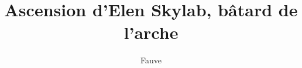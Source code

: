 %
%
%
%



\title{Ascension d’Elen Skylab, bâtard de l’arche}
\author{Fauve}
\date{}


\makeatletter
\makeatother
